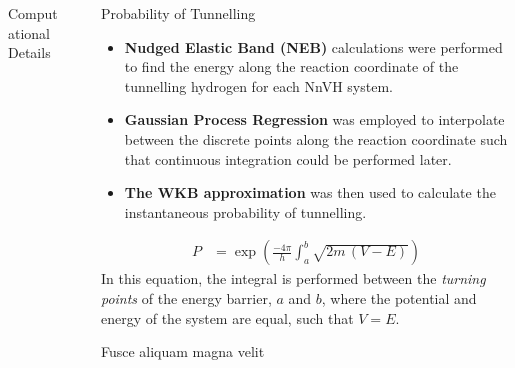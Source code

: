 \documentclass[final]{beamer}
\newlength{\sepwidth}
\newlength{\colwidth}
\newcommand{\separatorcolumn}{\begin{column}{\sepwidth}\end{column}}
\begin{document}
\begin{frame}[t]
\begin{columns}[t]
\begin{column}{\colwidth}
\begin{alertblock}{Computational Details}
  \end{alertblock}

\end{column}

\separatorcolumn

\begin{column}{\colwidth}

  \begin{block}{Probability of Tunnelling}

    \begin{itemize}
      \item \textbf{Nudged Elastic Band (NEB)} calculations were performed to find the energy along the reaction coordinate of the tunnelling hydrogen for each NnVH system.
      \item \textbf{Gaussian Process Regression} was employed to interpolate between the discrete points along the reaction coordinate such that continuous integration could be performed later.
      \item \textbf{The WKB approximation} was then used to calculate the instantaneous probability of tunnelling.  
    \end{itemize}
    \begin{align*}        
        P &= \exp \left(\frac{-4\pi}{h}\int_a^b \sqrt{2m\,(V-E)}  \right)
    \end{align*}
    In this equation, the integral is performed between the \emph{turning points} of the energy barrier, $a$ and $b$, where the potential and energy of the system are equal, such that $V = E$. 


  \end{block}

  \begin{block}{Fusce aliquam magna velit}


\end{block}
\end{column}
\end{columns}
\end{frame}
\end{document}
